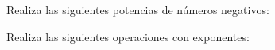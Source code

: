 \documentclass[12pt,addpoints]{evalua}
\begin{document}
\begin{questions}
      \begin{multicols}{2}
      \end{multicols}

      \question[4] Realiza las siguientes potencias de números negativos:
     
      \begin{multicols}{2}
      \end{multicols}


      \question[6] Realiza las siguientes operaciones con exponentes:
   
      \begin{multicols}{3}
\end{multicols}
\end{questions}
\end{document}
